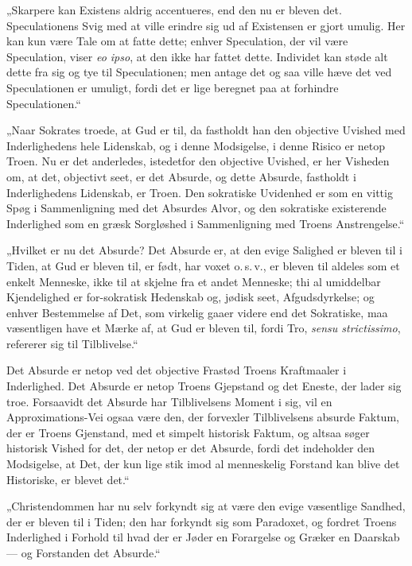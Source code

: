 „Skarpere kan Existens aldrig accentueres, end den nu er bleven
det. Speculationens Svig med at ville erindre sig ud af Existensen
er gjort umulig. Her kan kun være Tale om at fatte dette; enhver
Speculation, der vil være Speculation, viser \textit{eo ipso}, at
den ikke har fattet dette. Individet kan støde alt dette fra sig
og tye til Speculationen; men antage det og saa ville hæve det ved
Speculationen er umuligt, fordi det er lige beregnet paa at
forhindre Speculationen.“

„Naar Sokrates troede, at Gud er til, da fastholdt han den
objective Uvished med Inderlighedens hele Lidenskab, og i denne
Modsigelse, i denne Risico er netop Troen. Nu er det anderledes,
istedetfor den objective Uvished, er her Visheden om, at det,
objectivt seet, er det Absurde, og dette Absurde, fastholdt i
Inderlighedens Lidenskab, er Troen. Den sokratiske
 Uvidenhed er som en vittig Spøg i Sammenligning med det Absurdes
Alvor, og den sokratiske existerende Inderlighed som en græsk
Sorgløshed i Sammenligning med Troens Anstrengelse.“

„Hvilket er nu det Absurde? Det Absurde er, at den evige Salighed
er bleven til i Tiden, at Gud er bleven til, er født, har voxet
o.\,s.\,v., er bleven til aldeles som et enkelt Menneske, ikke til
at skjelne fra et andet Menneske; thi al umiddelbar Kjendelighed
er for-sokratisk Hedenskab og, jødisk seet, Afgudsdyrkelse; og
enhver Bestemmelse af Det, som virkelig gaaer videre end det
Sokratiske, maa væsentligen have et Mærke af, at Gud er bleven
til, fordi Tro, \textit{sensu strictissimo}, refererer sig til
Tilblivelse.“

Det Absurde er netop ved det objective Frastød Troens Kraftmaaler
i Inderlighed. Det Absurde er netop Troens Gjepstand og det
Eneste, der lader sig troe. Forsaavidt det Absurde har
Tilblivelsens Moment i sig, vil en Approximations-Vei ogsaa være
den, der forvexler
{} Tilblivelsens absurde Faktum, der er Troens Gjenstand, med et
simpelt historisk Faktum, og altsaa søger historisk Vished for
det, der netop er det Absurde, fordi det indeholder den
Modsigelse, at Det, der kun lige stik imod al menneskelig Forstand
kan blive det Historiske, er blevet det.“

„Christendommen har nu selv forkyndt sig at være den evige
væsentlige Sandhed, der er bleven til i Tiden; den har forkyndt
sig som Paradoxet, og fordret Troens
 Inderlighed i Forhold til hvad der er Jøder en Forargelse og
Græker en Daarskab --- og Forstanden det Absurde.“


